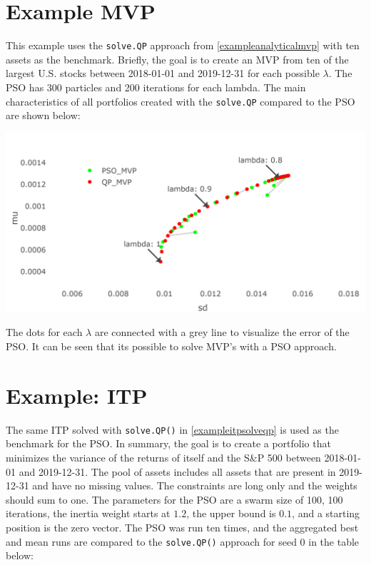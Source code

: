 \documentclass[
  oneside]{book}
\begin{document}
\hypertarget{example-mvp}{%
\section{Example MVP}\label{example-mvp}}

This example uses the \texttt{solve.QP} approach from \ref{exampleanalyticalmvp} with ten assets as the benchmark. Briefly, the goal is to create an MVP from ten of the largest U.S. stocks between 2018-01-01 and 2019-12-31 for each possible \(\lambda\). The PSO has 300 particles and 200 iterations for each lambda. The main characteristics of all portfolios created with the \texttt{solve.QP} compared to the PSO are shown below:

\includegraphics{Master_Thesis_files/figure-latex/pso7-1.png}

The dots for each \(\lambda\) are connected with a grey line to visualize the error of the PSO. It can be seen that its possible to solve MVP's with a PSO approach.

\hypertarget{example-itp-1}{%
\section{Example: ITP}\label{example-itp-1}}

The same ITP solved with \texttt{solve.QP()} in \ref{exampleitpsolveqp} is used as the benchmark for the PSO. In summary, the goal is to create a portfolio that minimizes the variance of the returns of itself and the S\&P 500 between 2018-01-01 and 2019-12-31. The pool of assets includes all assets that are present in 2019-12-31 and have no missing values. The constraints are long only and the weights should sum to one. The parameters for the PSO are a swarm size of 100, 100 iterations, the inertia weight starts at \(1.2\), the upper bound is \(0.1\), and a starting position is the zero vector. The PSO was run ten times, and the aggregated best and mean runs are compared to the \texttt{solve.QP()} approach for seed 0 in the table below:
\end{document}
